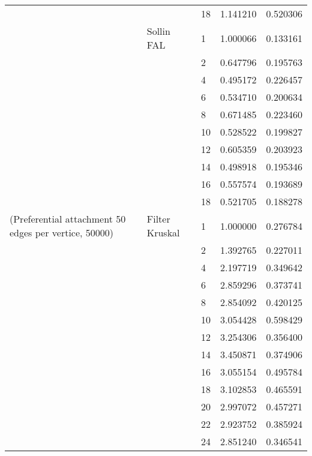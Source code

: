 \begin{tabular}{lllrr}
                      &            & 18 &  1.141210 &  0.520306 \\
                      & Sollin FAL & 1  &  1.000066 &  0.133161 \\
                      &            & 2  &  0.647796 &  0.195763 \\
                      &            & 4  &  0.495172 &  0.226457 \\
                      &            & 6  &  0.534710 &  0.200634 \\
                      &            & 8  &  0.671485 &  0.223460 \\
                      &            & 10 &  0.528522 &  0.199827 \\
                      &            & 12 &  0.605359 &  0.203923 \\
                      &            & 14 &  0.498918 &  0.195346 \\
                      &            & 16 &  0.557574 &  0.193689 \\
                      &            & 18 &  0.521705 &  0.188278 \\
(Preferential attachment 50 edges per vertice, 50000) & Filter Kruskal & 1  &  1.000000 &  0.276784 \\
                      &            & 2  &  1.392765 &  0.227011 \\
                      &            & 4  &  2.197719 &  0.349642 \\
                      &            & 6  &  2.859296 &  0.373741 \\
                      &            & 8  &  2.854092 &  0.420125 \\
                      &            & 10 &  3.054428 &  0.598429 \\
                      &            & 12 &  3.254306 &  0.356400 \\
                      &            & 14 &  3.450871 &  0.374906 \\
                      &            & 16 &  3.055154 &  0.495784 \\
                      &            & 18 &  3.102853 &  0.465591 \\
                      &            & 20 &  2.997072 &  0.457271 \\
                      &            & 22 &  2.923752 &  0.385924 \\
                      &            & 24 &  2.851240 &  0.346541 \\

\end{tabular}
